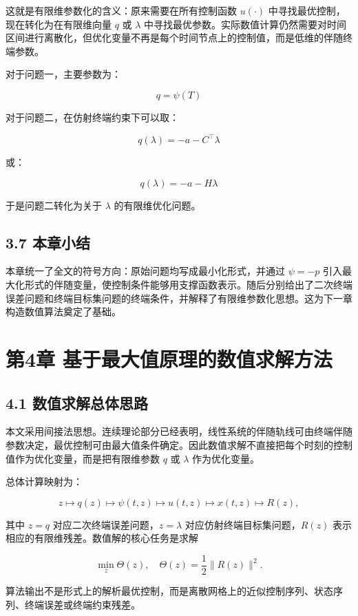 \documentclass[UTF8,a4paper,zihao=-4]{ctexart}
\begin{document}
这就是有限维参数化的含义：原来需要在所有控制函数 $u(\cdot)$ 中寻找最优控制，现在转化为在有限维向量 $q$ 或 $\lambda$ 中寻找最优参数\cite[第180--190页]{kiselev2007}\cite[第5--7页]{avvakumov1995}。实际数值计算仍然需要对时间区间进行离散化，但优化变量不再是每个时间节点上的控制值，而是低维的伴随终端参数。

对于问题一，主要参数为：

\[
q=\psi(T)
\]

对于问题二，在仿射终端约束下可以取：

\[
q(\lambda)=-a-C^\top\lambda
\]

或：

\[
q(\lambda)=-a-H\lambda
\]

于是问题二转化为关于 $\lambda$ 的有限维优化问题。

\subsection{3.7 本章小结}

本章统一了全文的符号方向：原始问题均写成最小化形式，并通过 $\psi=-p$ 引入最大化形式的伴随变量，使控制条件能够用支撑函数表示。随后分别给出了二次终端误差问题和终端目标集问题的终端条件，并解释了有限维参数化思想。这为下一章构造数值算法奠定了基础。

\section{第4章 基于最大值原理的数值求解方法}

\subsection{4.1 数值求解总体思路}

本文采用间接法思想\cite[第23--27页]{pontryagin1969}\cite[第3--7页]{avvakumov1995}。连续理论部分已经表明，线性系统的伴随轨线可由终端伴随参数决定，最优控制可由最大值条件确定。因此数值求解不直接把每个时刻的控制值作为优化变量，而是把有限维参数 $q$ 或 $\lambda$ 作为优化变量。

总体计算映射为：

\[
z
\longmapsto q(z)
\longmapsto \psi(t,z)
\longmapsto u(t,z)
\longmapsto x(t,z)
\longmapsto R(z),
\]

其中 $z=q$ 对应二次终端误差问题，$z=\lambda$ 对应仿射终端目标集问题，$R(z)$ 表示相应的有限维残差。数值解的核心任务是求解

\[
\min_z \Theta(z),\quad \Theta(z)=\frac{1}{2}\|R(z)\|^2.
\]

算法输出不是形式上的解析最优控制，而是离散网格上的近似控制序列、状态序列、终端误差或终端约束残差。
\end{document}
